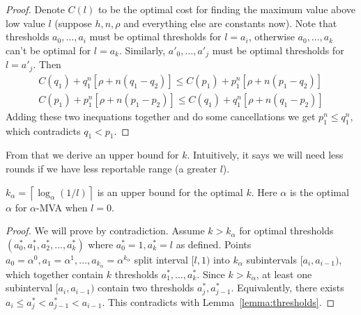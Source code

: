 \begin{proof}
Denote $C(l)$ to be the optimal cost for finding the maximum value above low
value $l$ (suppose $h, n, \rho$ and everything else are constants now). Note
that thresholds $a_0, \ldots, a_i$ must be optimal thresholds for $l = a_i$,
otherwise $a_0, \ldots, a_k$ can't be optimal for $l = a_k$.  Similarly,
$a'_0, \ldots, a'_j$ must be optimal thresholds for $l = a'_j$.  Then 
\begin{align*}
  C(q_1) + q_1^n [\rho+n(q_1-q_2)] \leq C(p_1) + p_1^n [\rho + n(p_1-q_2)]\\
  C(p_1) + p_1^n [\rho+n(p_1-p_2)] \leq C(q_1) + q_1^n [\rho + n(q_1-p_2)]
\end{align*}
Adding these two inequations together and do some cancellations we get
$p_1^n \leq q_1^n$, which contradicts $q_1 < p_1$.
\end{proof}

From that we derive an upper bound for $k$. Intuitively, it says we will need
less rounds if we have less reportable range (a greater $l$).

\begin{lemma}\label{lemma:k_upper}
$k_\alpha = \left\lceil \log_{\alpha} \left(1/l\right) \right\rceil$ is an
upper bound for the optimal $k$. Here $\alpha$ is the optimal $\alpha$ for
$\alpha$-MVA when $l = 0$. 
\end{lemma}

\begin{proof}
We will prove by contradiction. Assume $k > k_\alpha$ for optimal thresholds
$(a^*_0, a^*_1, a^*_2, \ldots, a^*_k)$ where $a^*_0 = 1, a^*_k = l$ as defined.  Points
$a_0 = \alpha^0, a_1 = \alpha^1, \ldots, a_{k_\alpha} = \alpha^{k_\alpha}$
split interval $[l, 1)$ into $k_\alpha$ subintervals $[a_i, a_{i-1})$, which
together contain $k$ thresholds $a^*_1, \ldots, a^*_k$. Since $k > k_\alpha$, at
least one subinterval $[a_i, a_{i-1})$ contain two thresholds $a^*_j, a^*_{j-1}$.
Equivalently, there exists $a_i \leq a^*_j < a^*_{j-1} < a_{i-1}$.  This
contradicts with Lemma~\ref{lemma:thresholds}.
\end{proof}

